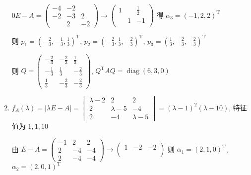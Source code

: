 \begin{enumerate}
                   \( 0E-A = \begin{pmatrix}
                       -4 & -2 &    \\
                       -2 & -3 & 2  \\
                          & 2  & -2
                   \end{pmatrix} \rightarrow \begin{pmatrix}
                       1 &   & \frac{1}{2} \\
                         & 1 & -1          \\
                         &   &
                   \end{pmatrix} \) 得 \( \alpha_{3} = (-1, 2, 2)^{\mathrm{T}} \)

                   则 \( p_{1} = \left( -\frac{2}{3}, -\frac{1}{3}, \frac{1}{3} \right)^{\mathrm{T}} \), \( p_{2} = \left( -\frac{2}{3}, \frac{1}{3}, -\frac{2}{3} \right)^{\mathrm{T}} \), \( p_{3} = \left( \frac{1}{3}, -\frac{2}{3}, -\frac{2}{3} \right)^{\mathrm{T}} \)

                   则 \( Q = \begin{pmatrix}
                       -\frac{2}{3} & -\frac{2}{3} & \frac{1}{3}  \\
                       -\frac{1}{3} & \frac{1}{3}  & -\frac{2}{3} \\
                       \frac{1}{3}  & -\frac{2}{3} & -\frac{2}{3}
                   \end{pmatrix} \), \( Q^{\mathrm{T}}AQ = \operatorname{diag}(6, 3, 0) \)
             \item %
                   \( f_{A}(\lambda) = |\lambda E - A| = \begin{vmatrix}
                       \lambda-2 & 2         & 2         \\
                       2         & \lambda-5 & -4        \\
                       2         & -4        & \lambda-5
                   \end{vmatrix} = (\lambda-1)^{2}(\lambda-10) \), 特征值为 \( 1, 1, 10 \)

                   由 \( E-A = \begin{pmatrix}
                       -1 & 2  & 2  \\
                       2  & -4 & -4 \\
                       2  & -4 & -4
                   \end{pmatrix} \rightarrow \begin{pmatrix}
                       1 & -2 & -2 \\
                         &    &    \\
                         &    &
                   \end{pmatrix} \) 则 \( \alpha_{1} = (2, 1, 0)^{\mathrm{T}} \), \( \alpha_{2} = (2, 0, 1)^{\mathrm{T}} \)


\end{enumerate}
